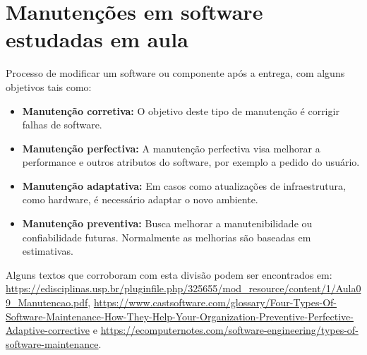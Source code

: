 \section{Manutenções em software estudadas em aula}
Processo de modificar um software ou componente após a entrega, com alguns objetivos tais como:
    \begin{itemize}
        \item \textbf{Manutenção corretiva:} O objetivo deste tipo de manutenção é corrigir falhas de software.
        \item \textbf{Manutenção perfectiva:} A manutenção perfectiva visa melhorar a performance e outros atributos do software, por exemplo a pedido do usuário.
        \item \textbf{Manutenção adaptativa:} Em casos como atualizações de infraestrutura, como hardware, é necessário adaptar o novo ambiente.
        \item \textbf{Manutenção preventiva:} Busca melhorar a manutenibilidade ou confiabilidade futuras. Normalmente as melhorias são baseadas em estimativas.
    \end{itemize}

Alguns textos que corroboram com esta divisão podem ser encontrados em: \url{https://edisciplinas.usp.br/pluginfile.php/325655/mod\_resource/content/1/Aula09\_Manutencao.pdf}, \url{https://www.castsoftware.com/glossary/Four-Types-Of-Software-Maintenance-How-They-Help-Your-Organization-Preventive-Perfective-Adaptive-corrective} e \url{https://ecomputernotes.com/software-engineering/types-of-software-maintenance}.

